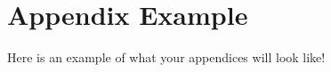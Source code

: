 \chapter[Appendix Example]{Appendix Example}
\label{app:example}

Here is an example of what your appendices will look like!
